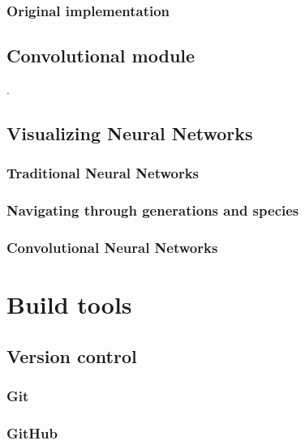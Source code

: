 \documentclass[11pt]{article}
\begin{document}
			\subsubsection{Original implementation}
				
		\subsection{Convolutional module}
		    .
        \subsection{Visualizing Neural Networks}
			\subsubsection{Traditional Neural Networks}
		    	
		    \subsubsection{Navigating through generations and species}
			    
			    \newpage
			\subsubsection{Convolutional Neural Networks}
	            
    \newpage

	\section{Build tools}
		\subsection{Version control}
			
			\subsubsection{Git}
				
			\subsubsection{GitHub}
				
\end{document}
